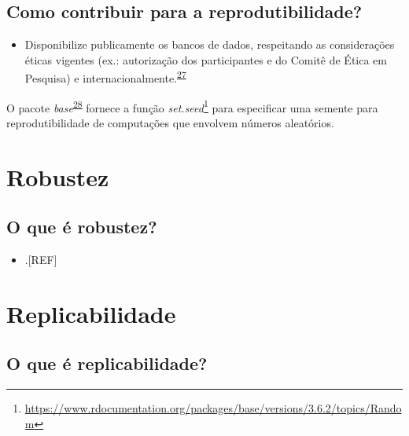 \documentclass[
  a4paper,
]{book}
\providecommand{\tightlist}{%
  \setlength{\itemsep}{0pt}\setlength{\parskip}{0pt}}
\renewcommand{\href}[2]{#2\footnote{\url{#1}}}
\newenvironment{infobox}[1]
  {
  \begin{itemize}
  \renewcommand{\labelitemi}{
    \raisebox{-.7\height}[0pt][0pt]{
      {\setkeys{Gin}{width=3em,keepaspectratio}
        \texttt{[image: \#1]}}
    }
  }
  \setlength{\fboxsep}{1em}
  \begin{blackbox}
  \item
  }
  {
  \end{blackbox}
  \end{itemize}
  }
\begin{document}
\hypertarget{como-contribuir-para-a-reprodutibilidade}{%
\subsection{Como contribuir para a reprodutibilidade?}\label{como-contribuir-para-a-reprodutibilidade}}

\begin{itemize}
\tightlist
\item
  Disponibilize publicamente os bancos de dados, respeitando as considerações éticas vigentes (ex.: autorização dos participantes e do Comitê de Ética em Pesquisa) e internacionalmente.\textsuperscript{\protect\hyperlink{ref-mair2016}{27}}
\end{itemize}

\begin{infobox}{images/Rlogo}
O pacote \emph{base}\textsuperscript{\protect\hyperlink{ref-base-5}{28}} fornece a função \href{https://www.rdocumentation.org/packages/base/versions/3.6.2/topics/Random}{\emph{set.seed}} para especificar uma semente para reprodutibilidade de computações que envolvem números aleatórios.

\end{infobox}

\hypertarget{robustez}{%
\section{Robustez}\label{robustez}}

\hypertarget{o-que-uxe9-robustez}{%
\subsection{O que é robustez?}\label{o-que-uxe9-robustez}}

\begin{itemize}
\tightlist
\item
  .{[}REF{]}
\end{itemize}

\hypertarget{replicabilidade}{%
\section{Replicabilidade}\label{replicabilidade}}

\hypertarget{o-que-uxe9-replicabilidade}{%
\subsection{O que é replicabilidade?}\label{o-que-uxe9-replicabilidade}}
\end{document}
